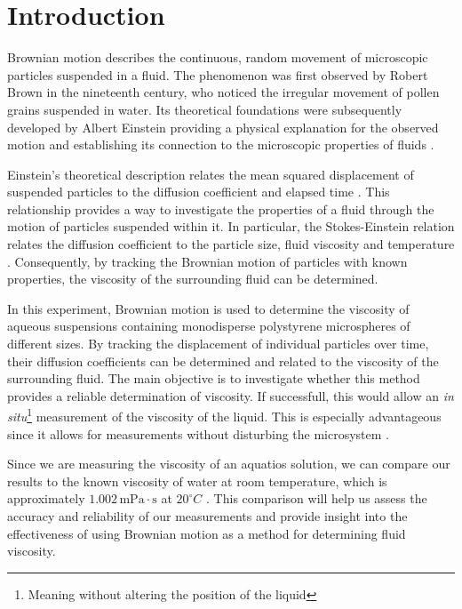 \documentclass[twocolumn,a4paper,aps,amsmath,amssymb,floatfix,superscriptaddress]{revtex4-2}
\begin{document}
\section{Introduction}\label{intro}
    Brownian motion describes the continuous, random movement of microscopic particles suspended in a fluid. The phenomenon was first observed by Robert Brown in the nineteenth century, who noticed the irregular movement of pollen grains suspended in water. Its theoretical foundations were subsequently developed by Albert Einstein providing a physical explanation for the observed motion and establishing its connection to the microscopic properties of fluids \cite{blundell2009}.

    Einstein's theoretical description relates the mean squared displacement of suspended particles to the diffusion coefficient and elapsed time \cite{einstein1905}. This relationship provides a way to investigate the properties of a fluid through the motion of particles suspended within it. In particular, the Stokes-Einstein relation relates the diffusion coefficient to the particle size, fluid viscosity and temperature \cite{britannica_brownian_motion}. Consequently, by tracking the Brownian motion of particles with known properties, the viscosity of the surrounding fluid can be determined.
    
    In this experiment, Brownian motion is used to determine the viscosity of aqueous suspensions containing monodisperse polystyrene microspheres of different sizes. By tracking the displacement of individual particles over time, their diffusion coefficients can be determined and related to the viscosity of the surrounding fluid. The main objective is to investigate whether this method provides a reliable determination of viscosity. If successfull, this would allow an \textit{in situ}\footnote{Meaning without altering the position of the liquid} measurement of the viscosity of the liquid. This is especially advantageous since it allows for measurements without disturbing the microsystem \cite{kimBrownianMicroscopySimultaneous2008}.

    Since we are measuring the viscosity of an aquatios solution, we can compare our results to the known viscosity of water at room temperature, which is approximately $1.002 \, \text{mPa}\cdot\text{s}$ at $20^\circ C$ \cite{rumble2018crc}. This comparison will help us assess the accuracy and reliability of our measurements and provide insight into the effectiveness of using Brownian motion as a method for determining fluid viscosity.
    
\end{document}
